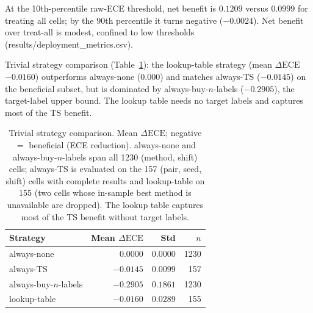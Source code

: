 \documentclass[review,12pt,nonatbib]{elsarticle}
\begin{document}

At the 10th-percentile raw-ECE
threshold, net benefit is $0.1209$ versus $0.0999$ for treating all cells;
by the 90th percentile it turns negative ($-0.0024$). Net benefit over
treat-all is modest, confined to low thresholds
(results/deployment\_metrics.csv).

Trivial strategy comparison (Table~\ref{tab:trivial}): the
lookup-table strategy (mean $\Delta\text{ECE}$ $-0.0160$) outperforms
always-none ($0.000$) and matches always-TS ($-0.0145$) on the beneficial
subset, but is dominated by always-buy-$n$-labels ($-0.2905$), the
target-label upper bound. The lookup table needs no target labels and
captures most of the TS benefit.

\begin{table}[t]
\centering
\caption{Trivial strategy comparison. Mean $\Delta\text{ECE}$; negative $=$
beneficial (ECE reduction). always-none and always-buy-$n$-labels span
all 1230 (method, shift) cells; always-TS is evaluated on the 157
(pair, seed, shift) cells with complete results and lookup-table on
155 (two cells whose in-sample best method is unavailable are
dropped). The lookup table captures most of the TS benefit without target labels.}
\label{tab:trivial}
\begin{tabular}{lrrr}
\toprule
Strategy & Mean $\Delta\text{ECE}$ & Std & $n$ \\
\midrule
always-none            & $\phantom{-}0.0000$  & $0.0000$ & 1230 \\
always-TS              & $-0.0145$            & $0.0099$ & 157  \\
always-buy-$n$-labels  & $-0.2905$            & $0.1861$ & 1230 \\
lookup-table           & $-0.0160$            & $0.0289$ & 155  \\
\bottomrule
\end{tabular}
\end{table}
\end{document}
